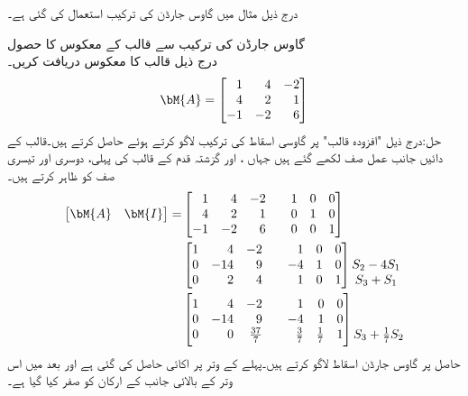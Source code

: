 درج ذیل مثال میں گاوس جارڈن کی ترکیب استعمال کی گئی ہے۔

\quad گاوس جارڈن کی ترکیب سے قالب کے معکوس کا حصول\\
درج ذیل قالب  کا معکوس  دریافت کریں۔
\begin{align*}
\bM{A}=\begin{bmatrix*}[r] 1&4&-2\\4&2&1\\-1&-2&6 \end{bmatrix*}
\end{align*}
حل:درج ذیل "افزودہ قالب" پر گاوسی اسقاط کی ترکیب لاگو کرتے ہوئے  حاصل کرتے ہیں۔قالب کے دائیں جانب عمل صف لکھے گئے ہیں جہاں ،  اور  گزشتہ قدم کے قالب کی پہلی، دوسری اور تیسری صف کو ظاہر کرتے ہیں۔
\begin{align*}
\begin{bmatrix}\bM{A}&\bM{I}  \end{bmatrix}=&\begin{bmatrix*}[r] 1&4&-2&& 1&0&0\\4&2&1 && 0&1&0\\-1&-2&6 && 0&0&1\end{bmatrix*}\\
&\begin{bmatrix*}[r] 1&4&-2&& 1&0&0\\0&-14&9&&-4&1&0\\0&2&4&&1&0&1\end{bmatrix*}
\begin{matrix} \\S_2-4S_1\\S_3+S_1 \end{matrix}\\
&\begin{bmatrix*}[r] 1&4&-2&& 1&0&0\\0&-14&9&&-4&1&0\\0&0&\frac{37}{7}&&\frac{3}{7}&\frac{1}{7}&1\end{bmatrix*}
\begin{matrix} \\ \\S_3+\frac{1}{7}S_2 \end{matrix}
\end{align*}
حاصل  پر گاوس جارڈن اسقاط لاگو کرتے ہیں۔پہلے  کے وتر پر اکائی حاصل کی گئی ہے اور بعد میں اس وتر کے بالائی جانب  کے ارکان کو صفر کیا گیا ہے۔
